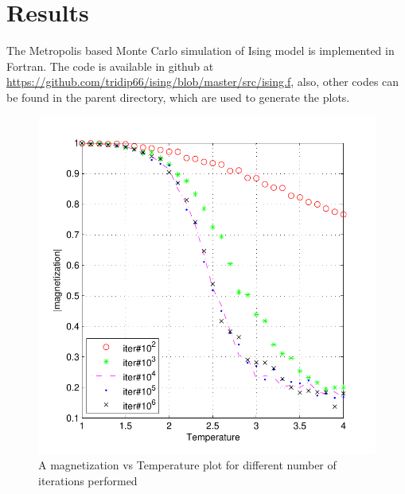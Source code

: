 \documentclass[]{article}
\begin{document}
\section{Results}
The Metropolis based Monte Carlo simulation of Ising model is implemented in Fortran. The code is available in github at \url{https://github.com/tridip66/ising/blob/master/src/ising.f}, also, other codes can be found in the parent directory, which are used 
to generate the plots.
\begin{figure}[p]
  \centering
  \includegraphics[scale=0.9]{figures/fig_1}%
  \caption{\label{fig:epsart} A magnetization vs Temperature plot for different number of iterations performed}
\end{figure}
\end{document}
